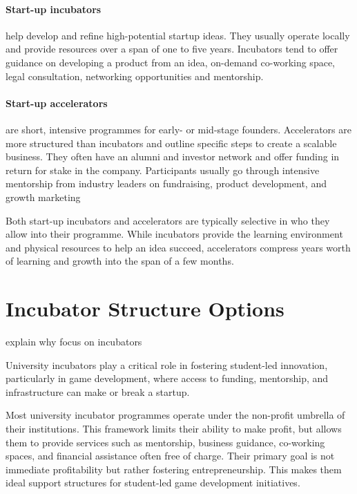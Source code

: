 \paragraph{Start-up incubators} help develop and refine high-potential startup ideas. They usually operate locally and provide resources over a span of one to five years. Incubators tend to offer guidance on developing a product from an idea, on-demand co-working space, legal consultation, networking opportunities and mentorship.
\paragraph{Start-up accelerators} are short, intensive programmes for early- or mid-stage founders. Accelerators are more structured than incubators and outline specific steps to create a scalable business. They often have an alumni and investor network and offer funding in return for stake in the company. Participants usually go through intensive mentorship from industry leaders on fundraising, product development, and growth marketing

Both start-up incubators and accelerators are typically selective in who they allow into their programme. While incubators provide the learning environment and physical resources to help an idea succeed, accelerators compress years worth of learning and growth into the span of a few months.

\section{Incubator Structure Options}
\begin{note}
explain why focus on incubators
\end{note}
University incubators play a critical role in fostering student-led innovation, particularly in game development, where access to funding, mentorship, and infrastructure can make or break a startup.

Most university incubator programmes operate under the non-profit umbrella of their institutions. This framework limits their ability to make profit, but allows them to provide services such as mentorship, business guidance, co-working spaces, and financial assistance often free of charge. Their primary goal is not immediate profitability but rather fostering entrepreneurship. This makes them ideal support structures for student-led game development initiatives.

